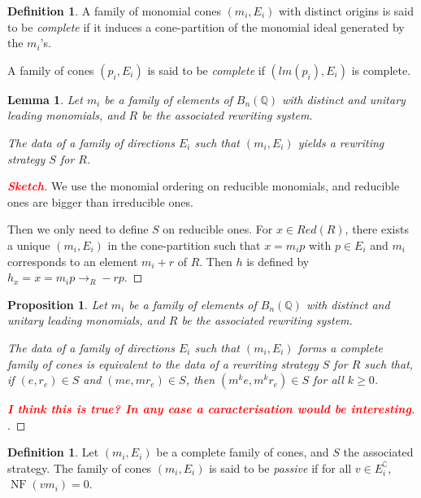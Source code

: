 \documentclass[10pt]{easychair}
\newtheorem{lemma}[theorem]{Lemma}
\newtheorem{proposition}[theorem]{Proposition}
\theoremstyle{definition}
\newtheorem{definition}[theorem]{Definition}
\newcommand\todo[1]{{\bf\textcolor{red}{#1}}}
\newcommand\Q{\mathbb{Q}}
\newcommand\Weyl[1]{B_{#1}(\Q)}
\newcommand\rewR{\to_R}
\DeclareMathOperator{\NF}{NF}
\begin{document}
 \begin{definition}
   A family of monomial cones $(m_i,E_i)$ with distinct origins is said
   to be \emph{complete} if it induces a cone-partition of the monomial ideal
   generated by the $m_i$'s. 

   A family of cones $(p_i,E_i)$ is said to be \emph{complete}
   if $(lm(p_i),E_i)$ is complete. 
 \end{definition}

 \begin{lemma}
   Let $m_i$ be a family of elements of $\Weyl n$ with distinct and unitary
   leading monomials, and $R$ be the associated rewriting system.
   
   The data of a family of directions $E_i$ such that $(m_i,E_i)$ yields a
   rewriting strategy $S$ for $R$.
\end{lemma}
\begin{proof}[\todo{Sketch}]
  We use the monomial ordering on reducible monomials,
  and reducible ones are bigger than irreducible ones.

  Then we only need to define $S$ on reducible ones. For $x \in Red(R)$,
  there exists a unique $(m_i,E_i)$ in the cone-partition such that $x=m_i p$
  with $p \in E_i$ and $m_i$ corresponds to an element $m_i + r$ of $R$.
  Then $h$ is defined by $h_x = x = m_ip  \rewR -rp$.
\end{proof}



 \begin{proposition}
   Let $m_i$ be a family of elements of $\Weyl n$ with distinct and unitary
   leading monomials, and $R$ be the associated rewriting system.
   
   The data of a family of directions $E_i$ such that $(m_i,E_i)$ forms a complete
   family of cones is equivalent to the data of a rewriting strategy $S$ for $R$
   such that, if $(e,r_e) \in S$ and $(me,mr_e) \in S$,
   then $(m^k e,m^k r_e) \in S$ for all $k \geq 0$.
 \end{proposition}
 \begin{proof}[\todo{I think this is true? In any case a caracterisation would be interesting}].

 \end{proof}

 
\begin{definition}
  Let $(m_i,E_i)$ be a complete family of cones, and $S$ the associated strategy.
  The family of cones $(m_i,E_i)$ is said to be \emph{passive} if for all
  $v \in E_i^\complement$, $\NF(vm_i) = 0$.
\end{definition}
\end{document}
